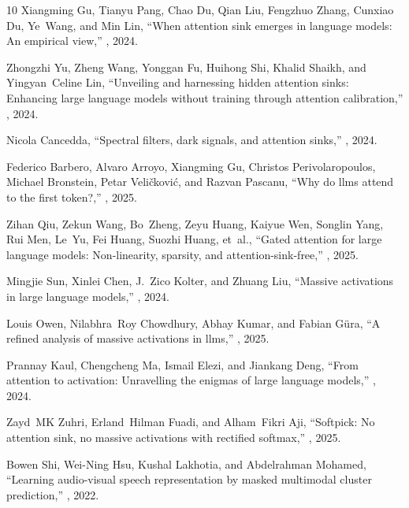 \documentclass{article}
\begin{document}
\begin{thebibliography}{10}
Xiangming Gu, Tianyu Pang, Chao Du, Qian Liu, Fengzhuo Zhang, Cunxiao Du,
  Ye~Wang, and Min Lin,
\newblock ``When attention sink emerges in language models: An empirical
  view,''
, 2024.

Zhongzhi Yu, Zheng Wang, Yonggan Fu, Huihong Shi, Khalid Shaikh, and
  Yingyan~Celine Lin,
\newblock ``Unveiling and harnessing hidden attention sinks: Enhancing large
  language models without training through attention calibration,''
, 2024.

Nicola Cancedda,
\newblock ``Spectral filters, dark signals, and attention sinks,''
, 2024.

Federico Barbero, Alvaro Arroyo, Xiangming Gu, Christos Perivolaropoulos,
  Michael Bronstein, Petar Veli{\v{c}}kovi{\'c}, and Razvan Pascanu,
\newblock ``Why do llms attend to the first token?,''
, 2025.

Zihan Qiu, Zekun Wang, Bo~Zheng, Zeyu Huang, Kaiyue Wen, Songlin Yang, Rui Men,
  Le~Yu, Fei Huang, Suozhi Huang, et~al.,
\newblock ``Gated attention for large language models: Non-linearity, sparsity,
  and attention-sink-free,''
, 2025.

Mingjie Sun, Xinlei Chen, J.~Zico Kolter, and Zhuang Liu,
\newblock ``Massive activations in large language models,''
, 2024.

Louis Owen, Nilabhra~Roy Chowdhury, Abhay Kumar, and Fabian G{\"u}ra,
\newblock ``A refined analysis of massive activations in llms,''
, 2025.

Prannay Kaul, Chengcheng Ma, Ismail Elezi, and Jiankang Deng,
\newblock ``From attention to activation: Unravelling the enigmas of large
  language models,''
, 2024.

Zayd~MK Zuhri, Erland~Hilman Fuadi, and Alham~Fikri Aji,
\newblock ``Softpick: No attention sink, no massive activations with rectified
  softmax,''
, 2025.

Bowen Shi, Wei-Ning Hsu, Kushal Lakhotia, and Abdelrahman Mohamed,
\newblock ``Learning audio-visual speech representation by masked multimodal
  cluster prediction,''
, 2022.


\end{thebibliography}
\end{document}
